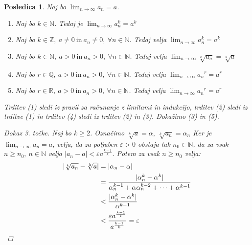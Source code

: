 \documentclass[10pt, a4paper]{article}
\newtheorem{posledica}[izr]{Posledica}
\newenvironment{noticeC}{%
  \tcolorbox[%
  notitle,
  empty,
  enhanced,  %
  breakable,
  coltext=black, 
  fontupper=\rmfamily,
  parbox=false,
  noparskip,
  sharp corners,
  boxrule=-1pt,  %
  frame hidden,
  left=7pt,  %
  right=7pt,
  top=5pt,
  bottom=5pt,
  before skip=2.5ex plus 2pt,
  after skip=2.5ex plus 2pt,
  overlay unbroken and last={%
  },
  ]}
{\endtcolorbox}
\newenvironment{dokaz}%
  {\begin{noticeC}\begin{proof}}%
  {\end{proof}\end{noticeC}}
\newcommand{\N}{\mathbb {N}}
\newcommand{\Z}{\mathbb {Z}}
\newcommand{\Q}{\mathbb {Q}}
\newcommand{\R}{\mathbb {R}}
\newcommand{\limzap}[1]{\lim_{n \to \infty} {#1}}
\begin{document}
\begin{posledica}
    Naj bo $\limzap{a_n} = a$.

    \begin{enumerate}
        \item Naj bo $k \in \N$. Tedaj je $\limzap{a_n^k} = a^k$
        \item Naj bo $k \in \Z,\ a\neq 0\ \text{in}\ a_n \neq 0,\ \forall n\in \N$. Tedaj velja $\limzap{a_n^k} = a^k$
        \item Naj bo $k \in \N,\ a > 0\ \text{in}\ a_n > 0,\ \forall n\in \N$. Tedaj velja $\limzap{\sqrt[k]{a_n}} = \sqrt[k]{a}$
        \item Naj bo $r \in \Q,\ a > 0\ \text{in}\ a_n > 0,\ \forall n\in \N$. Tedaj velja $\limzap{{a_n}^r} = a^r$
        \item Naj bo $r \in \R,\ a > 0\ \text{in}\ a_n > 0,\ \forall n\in \N$. Tedaj velja $\limzap{{a_n}^r} = a^r$
    \end{enumerate}

    Trditev (1) sledi iz pravil za računanje z limitami in indukcijo, trditev (2) sledi iz trditve (1) in trditev (4) sledi iz trditev (2) in (3).
    Dokažimo (3) in (5).

    \begin{dokaz}[Dokaz 3. točke]
        Naj bo $k \geq 2$. Označimo $\sqrt[k] {a} = \alpha,\ \sqrt[k]{a_n} = \alpha_n$ Ker je $\limzap{a_n} = a$, velja, da za poljuben $\varepsilon>0$ obstaja tak $n_0 \in \N$, da za vsak $n \geq n_0,\ n \in \N$ velja 
            $|a_n - a| < \varepsilon a^{\frac{k-1}{k}}.$ Potem za vsak $n \geq n_0$ velja:
            \begin{align*}
                |\sqrt[k] {a_n} - \sqrt[k]{a}| &= |\alpha_n - \alpha|\\
                &= \frac{|\alpha_n ^k - \alpha^k|}{\alpha_n^{k-1} + \alpha \alpha_n^{k-2} + \dots + \alpha^{k-1}}\\
                &< \frac{|\alpha_n ^k - \alpha^k|}{\alpha^{k-1}}\\
                &< \frac{\varepsilon a^{\frac{k-1}{k}}}{a^{\frac{k-1}{k}}} = \varepsilon \qedhere
            \end{align*}
        \end{dokaz}


\end{posledica}
\end{document}
